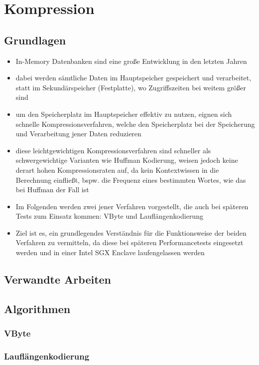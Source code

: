 
\chapter{Kompression}

\section{Grundlagen}
\begin{itemize}
	\item In-Memory Datenbanken sind eine große Entwicklung in den letzten Jahren
	\item dabei werden sämtliche Daten im Hauptspeicher gespeichert und verarbeitet, statt im Sekundärspeicher (Festplatte), wo Zugriffszeiten bei weitem größer sind
	\item um den Speicherplatz im Hauptspeicher effektiv zu nutzen, eignen sich schnelle Kompressionsverfahren, welche den Speicherplatz bei der Speicherung und Verarbeitung jener Daten reduzieren
	\item diese leichtgewichtigen Kompressionsverfahren sind schneller als schwergewichtige Varianten wie Huffman Kodierung, weisen jedoch keine derart hohen Kompressionsraten auf, da kein Kontextwissen in die Berechnung einfließt, bspw. die Frequenz eines bestimmten Wortes, wie das bei Huffman der Fall ist
	\item Im Folgenden werden zwei jener Verfahren vorgestellt, die auch bei späteren Tests zum Einsatz kommen: VByte und Lauflängenkodierung
	\item Ziel ist es, ein grundlegendes Verständnis für die Funktionsweise der beiden Verfahren zu vermitteln, da diese bei späteren Performancetests eingesetzt werden und in einer Intel SGX Enclave laufengelassen werden
\end{itemize}

\section{Verwandte Arbeiten}

\section{Algorithmen}
\subsection{VByte}
\subsection{Lauflängenkodierung}